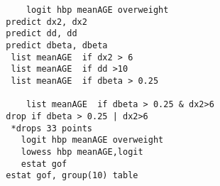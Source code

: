 \documentclass{article}
\begin{document}
 \begin{verbatim}
      logit hbp meanAGE overweight
  predict dx2, dx2
  predict dd, dd
  predict dbeta, dbeta
   list meanAGE  if dx2 > 6
   list meanAGE  if dd >10
   list meanAGE  if dbeta > 0.25
   
      list meanAGE  if dbeta > 0.25 & dx2>6
  drop if dbeta > 0.25 | dx2>6
   *drops 33 points
     logit hbp meanAGE overweight
	 lowess hbp meanAGE,logit
	 estat gof
  estat gof, group(10) table 
 \end{verbatim}
\end{document}
